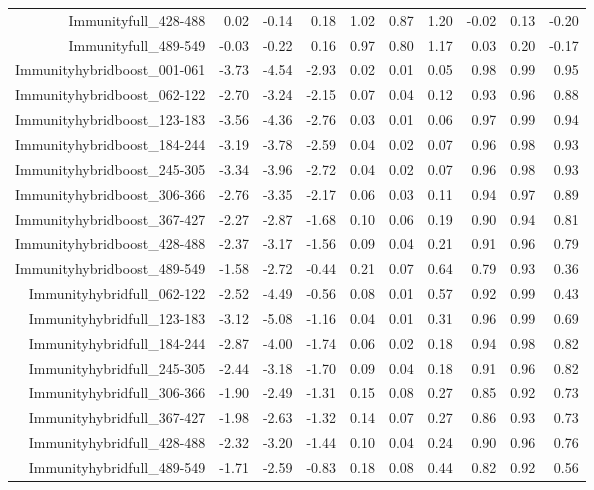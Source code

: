 \begin{table}[ht]
\begin{tabular}{rrrrrrrrrr}
  Immunityfull\_428-488 & 0.02 & -0.14 & 0.18 & 1.02 & 0.87 & 1.20 & -0.02 & 0.13 & -0.20 \\ 
  Immunityfull\_489-549 & -0.03 & -0.22 & 0.16 & 0.97 & 0.80 & 1.17 & 0.03 & 0.20 & -0.17 \\ 
  Immunityhybridboost\_001-061 & -3.73 & -4.54 & -2.93 & 0.02 & 0.01 & 0.05 & 0.98 & 0.99 & 0.95 \\ 
  Immunityhybridboost\_062-122 & -2.70 & -3.24 & -2.15 & 0.07 & 0.04 & 0.12 & 0.93 & 0.96 & 0.88 \\ 
  Immunityhybridboost\_123-183 & -3.56 & -4.36 & -2.76 & 0.03 & 0.01 & 0.06 & 0.97 & 0.99 & 0.94 \\ 
  Immunityhybridboost\_184-244 & -3.19 & -3.78 & -2.59 & 0.04 & 0.02 & 0.07 & 0.96 & 0.98 & 0.93 \\ 
  Immunityhybridboost\_245-305 & -3.34 & -3.96 & -2.72 & 0.04 & 0.02 & 0.07 & 0.96 & 0.98 & 0.93 \\ 
  Immunityhybridboost\_306-366 & -2.76 & -3.35 & -2.17 & 0.06 & 0.03 & 0.11 & 0.94 & 0.97 & 0.89 \\ 
  Immunityhybridboost\_367-427 & -2.27 & -2.87 & -1.68 & 0.10 & 0.06 & 0.19 & 0.90 & 0.94 & 0.81 \\ 
  Immunityhybridboost\_428-488 & -2.37 & -3.17 & -1.56 & 0.09 & 0.04 & 0.21 & 0.91 & 0.96 & 0.79 \\ 
  Immunityhybridboost\_489-549 & -1.58 & -2.72 & -0.44 & 0.21 & 0.07 & 0.64 & 0.79 & 0.93 & 0.36 \\ 
  Immunityhybridfull\_062-122 & -2.52 & -4.49 & -0.56 & 0.08 & 0.01 & 0.57 & 0.92 & 0.99 & 0.43 \\ 
  Immunityhybridfull\_123-183 & -3.12 & -5.08 & -1.16 & 0.04 & 0.01 & 0.31 & 0.96 & 0.99 & 0.69 \\ 
  Immunityhybridfull\_184-244 & -2.87 & -4.00 & -1.74 & 0.06 & 0.02 & 0.18 & 0.94 & 0.98 & 0.82 \\ 
  Immunityhybridfull\_245-305 & -2.44 & -3.18 & -1.70 & 0.09 & 0.04 & 0.18 & 0.91 & 0.96 & 0.82 \\ 
  Immunityhybridfull\_306-366 & -1.90 & -2.49 & -1.31 & 0.15 & 0.08 & 0.27 & 0.85 & 0.92 & 0.73 \\ 
  Immunityhybridfull\_367-427 & -1.98 & -2.63 & -1.32 & 0.14 & 0.07 & 0.27 & 0.86 & 0.93 & 0.73 \\ 
  Immunityhybridfull\_428-488 & -2.32 & -3.20 & -1.44 & 0.10 & 0.04 & 0.24 & 0.90 & 0.96 & 0.76 \\ 
  Immunityhybridfull\_489-549 & -1.71 & -2.59 & -0.83 & 0.18 & 0.08 & 0.44 & 0.82 & 0.92 & 0.56 \\ 

\end{tabular}
\end{table}
